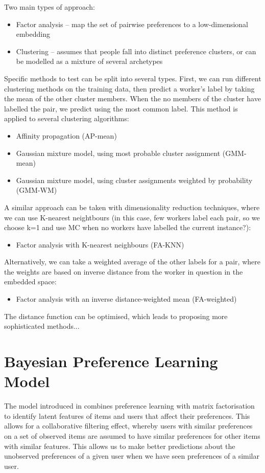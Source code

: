 Two main types of approach:
\begin{itemize}
  \item Factor analysis -- map the set of pairwise preferences to a low-dimensional embedding
  \item Clustering -- assumes that people fall into distinct preference clusters, or can be modelled as a mixture of several archetypes
\end{itemize}

Specific methods to test can be split into several types. First,
we can run different clustering methods on the training data, 
then predict a worker's label by taking the mean of the other cluster members. 
When the no members of the cluster have labelled the pair, we predict using the most common label.
This method is applied to several clustering algorithms:
\begin{itemize}
   \item Affinity propagation (AP-mean)
   \item Gaussian mixture model, using most probable cluster assignment (GMM-mean)
   \item Gaussian mixture model, using cluster assignments weighted by probability (GMM-WM)
\end{itemize}

A similar approach can be taken with dimensionality reduction techniques, where we can use K-nearest neightbours (in this case, few workers label each pair, so we choose k=1 and use MC when no workers have labelled the current instance?):
\begin{itemize}
   \item Factor analysis with K-nearest neighbours (FA-KNN)
\end{itemize}
Alternatively, we can take a weighted average of the other labels for a pair, where the weights are based on inverse distance from the worker in question in the embedded space:
\begin{itemize}
   \item Factor analysis with an inverse distance-weighted mean (FA-weighted)
\end{itemize}
The distance function can be optimised, which leads to proposing more sophisticated methods...

\section{Bayesian Preference Learning Model}

The model introduced in \cite{houlsby2012collaborative} combines preference learning with matrix factorisation 
to identify latent features of items and users that affect their preferences. This allows for a collaborative filtering effect, whereby users with similar preferences on a set of observed items are assumed to have similar 
preferences for other items with similar features. This allows us to make better predictions about the unobserved preferences of a given user when we have seen preferences of a similar user.

